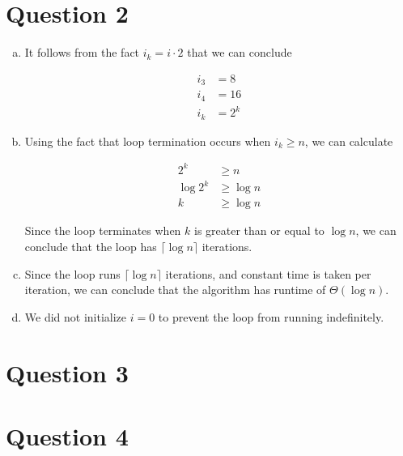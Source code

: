\documentclass[12pt]{article}
\begin{document}
\section*{Question 2}
\begin{enumerate}[a.]
    \item

    It follows from the fact $i_k = i \cdot 2$ that we can conclude

    \begin{align*}
    i_3 &= 8\\
    i_4 &= 16\\
    i_k &= 2^k
    \end{align*}

    \item

    Using the fact that loop termination occurs when $i_k \geq n$, we can
    calculate

    \setcounter{equation}{0}
    \begin{align}
        2^k &\geq n\\
        \log 2^k &\geq \log n\\
        k &\geq \log n
    \end{align}

    \bigskip

    Since the loop terminates when $k$ is greater than or equal to $\log n$, we
    can conclude that the loop has $\lceil \log n \rceil$ iterations.

    \item

    Since the loop runs $\lceil \log n \rceil$ iterations, and constant time is
    taken per iteration, we can conclude that the algorithm has runtime of
    $\Theta(\log n)$.

    \item

    We did not initialize $i = 0$ to prevent the loop from running indefinitely.

\end{enumerate}

\section*{Question 3}

\section*{Question 4}
\end{document}
